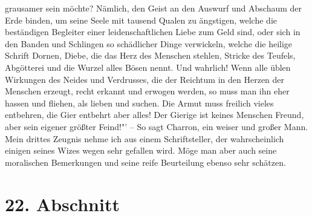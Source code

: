 {grausamer sein möchte? Nämlich, den Geist an den Auswurf und Abschaum der Erde
binden, um seine Seele mit tausend Qualen zu ängstigen, welche die beständigen
Begleiter einer leidenschaftlichen Liebe zum Geld sind, oder sich in den Banden
und Schlingen so schädlicher Dinge verwickeln, welche die heilige Schrift
Dornen, Diebe, die das Herz des Menschen stehlen, Stricke des Teufels,
Abgötterei und die Wurzel alles Bösen nennt. Und wahrlich! Wenn alle üblen
Wirkungen des Neides und Verdrusses, die der Reichtum in den Herzen der
Menschen erzeugt, recht erkannt und erwogen werden, so muss man ihn eher hassen
und fliehen, als lieben und suchen. Die Armut muss freilich vieles entbehren,
die Gier entbehrt aber alles! Der Gierige ist keines Menschen Freund, aber sein
eigener größter Feind!"'} -- So sagt Charron, ein
weiser und großer Mann. Mein
drittes Zeugnis nehme ich aus einem Schriftsteller, der wahrscheinlich einigen
seines Wizes wegen sehr gefallen wird. Möge man aber auch seine moralischen
Bemerkungen und seine reife Beurteilung ebenso sehr schätzen.

\section{22. Abschnitt} \label{kap13_ab22}

